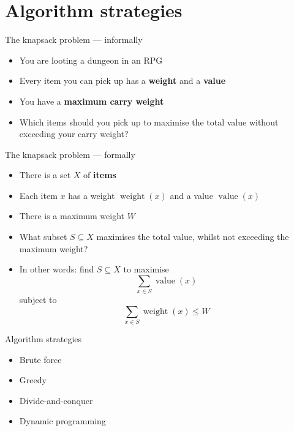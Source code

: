 \part{Algorithm strategies}
\frame{\partpage}

\newcommand{\weight}{\operatorname{weight}}
\newcommand{\val}{\operatorname{value}}
\newcommand{\best}{{\text{best}}}

\begin{frame}{The knapsack problem --- informally}
	\begin{itemize}
		\pause\item You are looting a dungeon in an RPG
		\pause\item Every item you can pick up has a \textbf{weight} and a \textbf{value}
		\pause\item You have a \textbf{maximum carry weight}
		\pause\item Which items should you pick up to maximise the total value without exceeding your carry weight?
	\end{itemize}
\end{frame}

\begin{frame}{The knapsack problem --- formally}
	\begin{itemize}
		\pause\item There is a set $X$ of \textbf{items}
		\pause\item Each item $x$ has a weight $\weight(x)$ and a value $\val(x)$
		\pause\item There is a maximum weight $W$
		\pause\item What subset $S \subseteq X$ maximises the total value, whilst not exceeding the maximum weight?
		\pause\item In other words: find $S \subseteq X$ to maximise
			$$ \sum_{x \in S} \val(x) $$
		subject to
			$$ \sum_{x \in S} \weight(x) \leq W $$
	\end{itemize}
\end{frame}

\begin{frame}{Algorithm strategies}
	\begin{itemize}
		\pause\item Brute force
		\pause\item Greedy
		\pause\item Divide-and-conquer
		\pause\item Dynamic programming
	\end{itemize}
\end{frame}

